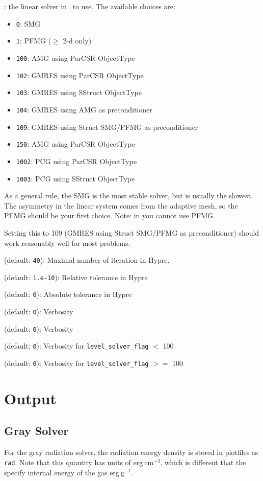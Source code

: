 \begin{description}
\item {}: the linear solver
  in \hypre\ to use.  The available choices are:
  \begin{itemize}
    \item {\tt 0}: SMG
    \item {\tt 1}: PFMG  ($\ge$ 2-d only)
    \item {\tt 100}: AMG using ParCSR ObjectType
    \item {\tt 102}: GMRES using ParCSR ObjectType
    \item {\tt 103}: GMRES using SStruct ObjectType
    \item {\tt 104}: GMRES using AMG as preconditioner
    \item {\tt 109}: GMRES using Struct SMG/PFMG as preconditioner
    \item {\tt 150}: AMG using ParCSR ObjectType
    \item {\tt 1002}: PCG using ParCSR ObjectType
    \item {\tt 1003}: PCG using SStruct ObjectType
  \end{itemize}

  As a general rule, the SMG is the most stable solver, but is usually
  the slowest.  The asymmetry in the linear system comes from the
  adaptive mesh, so the PFMG should be your first choice.  Note: in
  you cannot use PFMG.

  Setting this to 109 (GMRES using Struct SMG/PFMG as preconditioner)
  should work reasonably well for most problems.

\item {} (default: {\tt 40}): 
  Maximal number of iteration in Hypre.

\item {} (default: {\tt 1.e-10}):
  Relative tolerance in Hypre

\item {} (default: {\tt 0}):
  Absolute tolerance in Hypre

\item {} (default: {\tt 0}):
  Verbosity

\item {} (default: {\tt 0}):
  Verbosity

\item {} (default: {\tt 0}):
  Verbosity for {\tt level\_solver\_flag} $<$ 100

\item {} (default: {\tt 0}):
  Verbosity for {\tt level\_solver\_flag} $>=$ 100
\end{description}


\section{Output}

\subsection{Gray Solver}

For the gray radiation solver, the radiation energy density is stored in plotfiles
as {\tt rad}.  Note that this quantity has units of $\mathrm{erg~cm^{-3}}$, which
is different that the specify internal energy of the gas $\mathrm{erg~g^{-1}}$.


